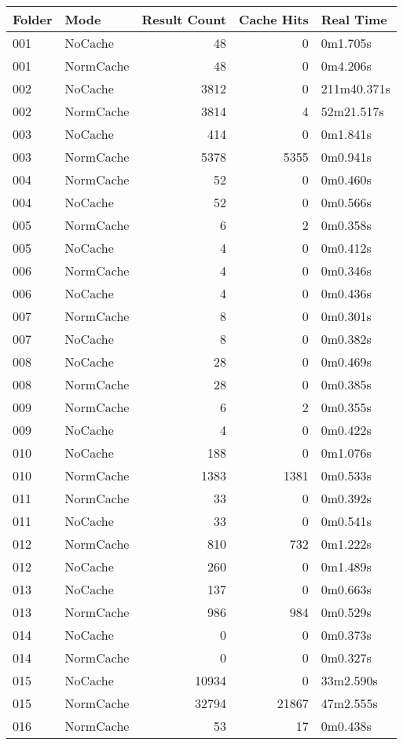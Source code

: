 \begin{tabular}{llrrl}
\toprule
Folder & Mode & Result Count & Cache Hits & Real Time \\
\midrule
001 & NoCache & 48 & 0 & 0m1.705s \\
001 & NormCache & 48 & 0 & 0m4.206s \\
002 & NoCache & 3812 & 0 & 211m40.371s \\
002 & NormCache & 3814 & 4 & 52m21.517s \\
003 & NoCache & 414 & 0 & 0m1.841s \\
003 & NormCache & 5378 & 5355 & 0m0.941s \\
004 & NormCache & 52 & 0 & 0m0.460s \\
004 & NoCache & 52 & 0 & 0m0.566s \\
005 & NormCache & 6 & 2 & 0m0.358s \\
005 & NoCache & 4 & 0 & 0m0.412s \\
006 & NormCache & 4 & 0 & 0m0.346s \\
006 & NoCache & 4 & 0 & 0m0.436s \\
007 & NormCache & 8 & 0 & 0m0.301s \\
007 & NoCache & 8 & 0 & 0m0.382s \\
008 & NoCache & 28 & 0 & 0m0.469s \\
008 & NormCache & 28 & 0 & 0m0.385s \\
009 & NormCache & 6 & 2 & 0m0.355s \\
009 & NoCache & 4 & 0 & 0m0.422s \\
010 & NoCache & 188 & 0 & 0m1.076s \\
010 & NormCache & 1383 & 1381 & 0m0.533s \\
011 & NormCache & 33 & 0 & 0m0.392s \\
011 & NoCache & 33 & 0 & 0m0.541s \\
012 & NormCache & 810 & 732 & 0m1.222s \\
012 & NoCache & 260 & 0 & 0m1.489s \\
013 & NoCache & 137 & 0 & 0m0.663s \\
013 & NormCache & 986 & 984 & 0m0.529s \\
014 & NoCache & 0 & 0 & 0m0.373s \\
014 & NormCache & 0 & 0 & 0m0.327s \\
015 & NoCache & 10934 & 0 & 33m2.590s \\
015 & NormCache & 32794 & 21867 & 47m2.555s \\
016 & NormCache & 53 & 17 & 0m0.438s \\

\end{tabular}
